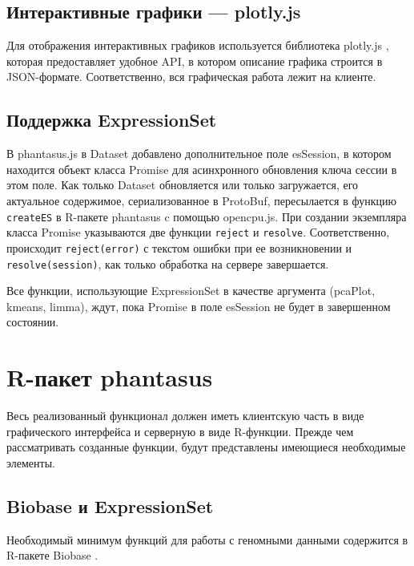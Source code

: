 \documentclass[specification,annotation]{itmo-student-thesis}
\begin{document}
\subsection{Интерактивные графики --- plotly.js}
Для отображения интерактивных графиков используется библиотека plotly.js \cite{plotly}, которая предоставляет удобное API, в котором описание графика строится в JSON-формате. Соответственно, вся графическая работа лежит на клиенте.

\subsection{Поддержка ExpressionSet}
В phantasus.js в Dataset добавлено дополнительное поле esSession, в котором находится объект класса Promise для асинхронного обновления ключа сессии в этом поле.
Как только Dataset обновляется или только загружается, его актуальное содержимое, сериализованное в ProtoBuf, пересылается в функцию \texttt{createES} в R-пакете phantasus c помощью opencpu.js.
При создании экземпляра класса Promise указываются две функции \texttt{reject} и \texttt{resolve}. Соответственно, происходит \texttt{reject(error)} с текстом ошибки при ее возникновении и \texttt{resolve(session)}, как только обработка на сервере завершается.

Все функции, использующие ExpressionSet в качестве аргумента (pcaPlot, kmeans, limma), ждут, пока Promise в поле esSession не будет в завершенном состоянии.

\section{R-пакет phantasus}
Весь реализованный функционал должен иметь клиентскую часть в виде графического интерфейса и серверную в виде R-функции.
Прежде чем рассматривать созданные функции, будут представлены имеющиеся необходимые элементы.

\subsection{Biobase и ExpressionSet}
Необходимый минимум функций для работы с геномными данными содержится в R-пакете Biobase \cite{biobase}.
\end{document}
